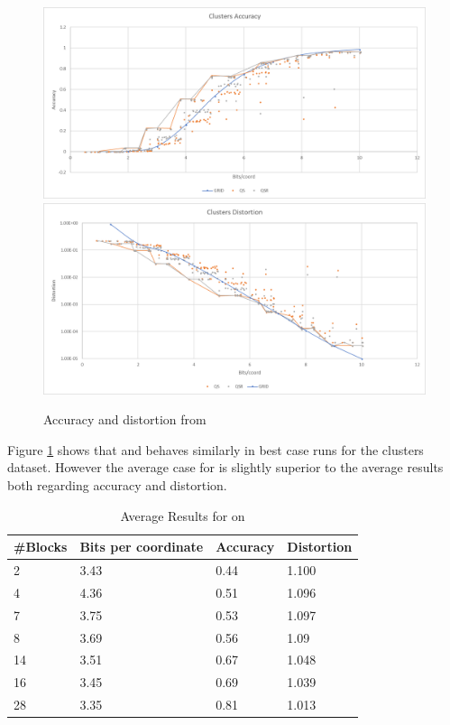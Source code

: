 \begin{figure}[h!]
\includegraphics[width=\textwidth]{figures/graphs/clusters_accuracy}
\includegraphics[width=\textwidth]{figures/graphs/clusters_distortion}
\caption{Accuracy and distortion from \clust{}}
\label{fig:graph clust}
\end{figure}
Figure \ref{fig:graph clust} shows that \qs{} and \qsr{} behaves similarly in best case runs for the clusters dataset. However the average case for \qsr{} is slightly superior to the \qs{} average results both regarding accuracy and distortion.
\clearpage{}


\begin{table}[h]
	\centering
	\caption{Average Results for \qs{} on \mnist{}}
	\label{table:avg_mnist_qs2}
	\begin{tabular}{l l l l}
		\hline
		\#Blocks & Bits per coordinate & Accuracy  & Distortion \\ \hline
		2 & 3.43 & 0.44 & 1.100  \\
		4 & 4.36 & 0.51 & 1.096  \\
		7 & 3.75 & 0.53 & 1.097 \\
		8 & 3.69 & 0.56 & 1.09 \\
		14 & 3.51 & 0.67 & 1.048 \\
		16 & 3.45 & 0.69 & 1.039 \\
		28 & 3.35 & 0.81 & 1.013 \\
		\hline
	\end{tabular}
\end{table}

